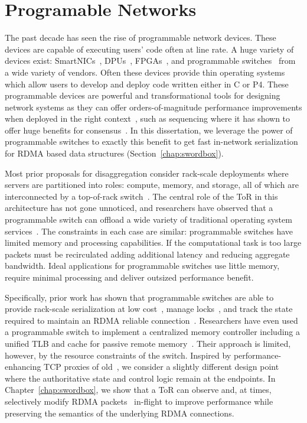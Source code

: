 \documentclass[12pt]{ucsddissertation}
\begin{document}
\section{Programable Networks}
\label{sec:programmable-networks}


The past decade has seen the rise of programmable network devices. These devices are capable of
executing users' code often at line rate. A huge variety of devices exist:
SmartNICs~\cite{fairnic,e3,ipipe,floem}, DPUs~\cite{dsnf},
FPGAs~\cite{azure-smartnic,clio,catapult,supernic}, and programmable
switches~\cite{p4,netchain,netcache,netlock} from a wide variety of vendors. Often these devices
provide thin operating systems which allow users to develop and deploy code written either in C or
P4. These programmable devices are powerful and transformational tools for designing network systems
as they can offer orders-of-magnitude performance improvements when deployed in the right
context~\cite{when-computer}, such as sequencing where it has shown to offer huge benefits for
consensus~\cite{eris, nopaxos}. In this dissertation, we leverage the power of programmable switches
to exactly this benefit to get fast in-network serialization for RDMA based data structures
(Section~\ref{chap:swordbox}).

Most prior proposals for disaggregation consider rack-scale deployments where servers are
partitioned into roles: compute, memory, and storage, all of which are interconnected by a
top-of-rack switch~\cite{disandapp,the-machine,intel-rack,firebox,legoos}. The central role of the
ToR in this architecture has not gone unnoticed, and researchers have observed that a programmable
switch can offload a wide variety of traditional operating system
services~\cite{disandapp,mind,netlock,netkv,netchain,netcache}. The constraints in each case are
similar: programmable switches have limited memory and processing capabilities. If the computational
task is too large packets must be recirculated adding additional latency and reducing aggregate
bandwidth. Ideal applications for programmable switches use little memory, require minimal
processing and deliver outsized performance benefit.

Specifically, prior work has shown that programmable switches are able to provide rack-scale
serialization at low cost~\cite{eris,no-paxos,when-computer,Grant2021InContRes}, manage
locks~\cite{netlock}, and track the state required to maintain an RDMA reliable
connection~\cite{tea}. Researchers have even used a programmable switch to implement a centralized
memory controller including a unified TLB and cache for passive remote memory~\cite{mind}. Their
approach is limited, however, by the resource constraints of the switch. Inspired by
performance-enhancing TCP proxies of old~\cite{snoop,rfc3135}, we consider a slightly different
design point where the authoritative state and control logic remain at the endpoints. In
Chapter~\ref{chap:swordbox}, we show that a ToR can observe and, at times, selectively modify RDMA
packets~\cite{switchml,Grant2021InContRes} in-flight to improve performance while preserving the
semantics of the underlying RDMA connections.
\end{document}
